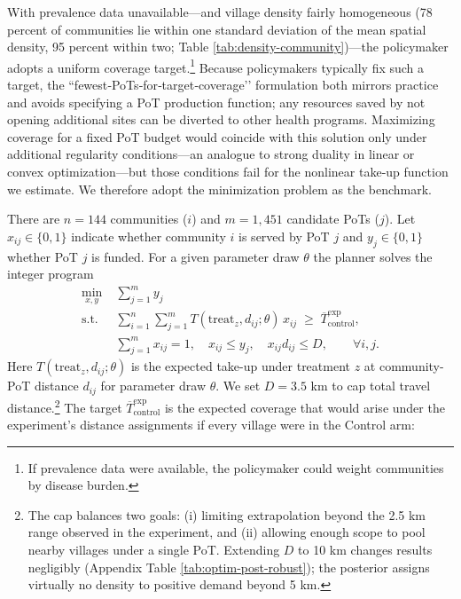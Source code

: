 \documentclass[12pt,a4paper]{article}
\begin{document}
With prevalence data unavailable—and village density fairly homogeneous (78 percent of communities lie within one standard deviation of the mean spatial density, 95 percent within two; Table \ref{tab:density-community})—the policymaker adopts a uniform coverage target.\footnote{If prevalence data were available, the policymaker could weight communities by disease burden.}  Because policymakers typically fix such a target, the “fewest‑PoTs‑for‑target‑coverage’’ formulation both mirrors practice and avoids specifying a PoT production function; any resources saved by not opening additional sites can be diverted to other health programs.  Maximizing coverage for a fixed PoT budget would coincide with this solution only under additional regularity conditions—an analogue to strong duality in linear or convex optimization—but those conditions fail for the nonlinear take‑up function we estimate.  We therefore adopt the minimization problem as the benchmark.

There are \(n=144\) communities (\(i\)) and \(m=1{,}451\) candidate PoTs (\(j\)).  
Let \(x_{ij}\in\{0,1\}\) indicate whether community \(i\) is served by PoT \(j\) and \(y_j\in\{0,1\}\) whether PoT \(j\) is funded.  
For a given parameter draw \(\theta\) the planner solves the integer program
\begin{align}
\min_{x,y}\;&\sum_{j=1}^{m} y_j  \nonumber \\[2pt]
\text{s.t.}\;&\sum_{i=1}^{n}\sum_{j=1}^{m}
     T(\text{treat}_z,d_{ij};\theta)\,x_{ij}
     \;\ge\;
     \overline T^{\text{exp}}_{\text{control}}, \nonumber\\[2pt]
&\sum_{j=1}^{m} x_{ij}=1,\quad
  x_{ij}\le y_j,\quad
  x_{ij}d_{ij}\le D,\qquad\forall i,j. \label{eq:oa-problem}
\end{align}
Here $T(\textrm{treat}_z, d_{ij};\theta)$ is the expected take-up under treatment $z$ at community-PoT distance \(d_{ij}\) for parameter draw $\theta$. We set \(D=3.5\) km to cap total travel distance.\footnote{The cap balances two goals: (i) limiting extrapolation beyond the 2.5 km range observed in the experiment, and (ii) allowing enough scope to pool nearby villages under a single PoT.  Extending \(D\) to 10 km changes results negligibly (Appendix Table \ref{tab:optim-post-robust}); the posterior assigns virtually no density to positive demand beyond 5 km.}  
The target \(\overline T^{\text{exp}}_{\text{control}}\) is the expected coverage that would arise under the experiment’s distance assignments if every village were in the Control arm:  
\end{document}
